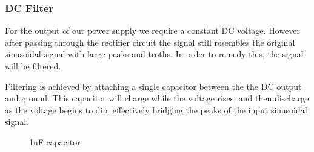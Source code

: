 \documentclass[a4paper,11pt]{article}
\begin{document}
\subsubsection{DC Filter}

For the output of our power supply we require a constant DC voltage. However after passing through the rectifier circuit the signal still resembles the original sinusoidal signal with large peaks and troths. In order to remedy this, the signal will be filtered.

Filtering is achieved by attaching a single capacitor between the the DC output and ground. This capacitor will charge while the voltage rises, and then discharge as the voltage begins to dip, effectively bridging the peaks of the input sinusoidal signal.

\begin{figure}[!htb]
  \caption{1uF capacitor}
\endminipage\hfill
{}

\end{figure}
\end{document}
